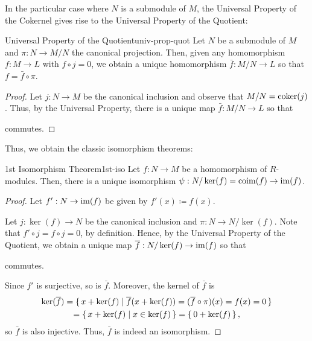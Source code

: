 In the particular case where $N$ is a submodule of $M$, the Universal Property of the Cokernel gives rise to the Universal Property of the Quotient:
\begin{theorem}{Universal Property of the Quotient}{univ-prop-quot}
	Let $N$ be a submodule of $M$ and $\pi : N \to M / N$ the canonical projection.
	Then, given any homomorphism $f : M \to L$ with $f \circ j = 0$, we obtain a unique homomorphism $\bar{f} : M / N \to L$ so that $f = \bar{f} \circ \pi$.
\end{theorem}
\begin{proof}
	Let $j : N \to M$ be the canonical inclusion and observe that $M / N = \operatorname{coker}(j)$.
	Thus, by the Universal Property, there is a unique map $\bar{f} : M / N \to L$ so that
	\begin{figure}[H]
		\centering
	\end{figure}
	commutes.
\end{proof}

Thus, we obtain the classic isomorphism theorems:

\begin{theorem}{1st Isomorphism Theorem}{1st-iso}
	Let $f : N \to M$ be a homomorphism of $R$-modules.
	Then, there is a unique isomorphism $\psi : N / \ker(f) = \operatorname{coim}(f) \to \operatorname{im}(f)$.
\end{theorem}
\begin{proof}
	Let $f' : N \to \operatorname{im}(f)$ be given by $f'(x) \coloneq f(x)$.

	Let $j : \ker(f) \to N$ be the canonical inclusion and $\pi : N \to N / \ker(f)$.
	Note that $f' \circ j = f \circ j = 0$, by definition.
	Hence, by the Universal Property of the Quotient, we obtain a unique map $\overline{f} : N / \ker(f) \to \operatorname{im}(f)$ so that
	\begin{figure}[H]
		\centering
	\end{figure}
	commutes.

	Since $f'$ is surjective, so is $\bar{f}$.
	Moreover, the kernel of $\bar{f}$ is
	\begin{multline*}
		\ker(\overline{f}) = \set{ x + \ker(f) \mid \overline{f}(x + \ker(f)) = (\overline{f} \circ \pi)(x) = f(x) = 0 } \\
		= \set{ x + \ker(f) \mid x \in \ker(f) } = \set{ 0 + \ker(f) },
	\end{multline*}
	so $\bar{f}$ is also injective.
	Thus, $\bar{f}$ is indeed an isomorphism.
\end{proof}

